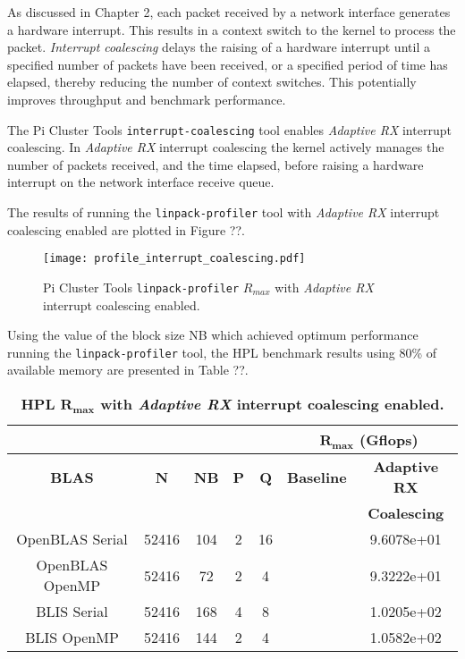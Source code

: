 As discussed in Chapter 2, each packet received by a network interface generates a hardware interrupt. This results in a context switch to the kernel to process the packet. \emph{Interrupt coalescing} delays the raising of a hardware interrupt until a specified number of packets have been received, or a specified period of time has elapsed, thereby reducing the number of context switches. This potentially improves throughput and benchmark performance.

The Pi Cluster Tools \verb|interrupt-coalescing| tool enables \emph{Adaptive RX} interrupt coalescing. In \emph{Adaptive RX} interrupt coalescing the kernel actively manages the number of packets received, and the time elapsed, before raising a hardware interrupt on the network interface receive queue.

The results of running the \verb|linpack-profiler| tool with \emph{Adaptive RX} interrupt coalescing enabled are plotted in Figure ??.

\begin{figure}[h]
	\centering
	\texttt{[image: profile\_interrupt\_coalescing.pdf]}
	\caption{Pi Cluster Tools \texttt{linpack-profiler} $R_{max}$ with \emph{Adaptive RX} interrupt coalescing enabled.}
	\label{fig:subim1}
\end{figure}

Using the value of the block size NB which achieved optimum performance running the \texttt{linpack-profiler} tool, the HPL benchmark results using 80\% of available memory are presented in Table ??. 

\begin{table}[H]
\begin{center}
\begin{tabular}{ |c|c|c|c|c|c|c| } 
\hline
\multicolumn{5}{|c}{} & \multicolumn{2}{|c|}{$\mathbf{R_{max}}$ \textbf{(Gflops)}} \\
\hline
\textbf{BLAS} & \textbf{N} & \textbf{NB} & \textbf{P} & \textbf{Q} & \textbf{Baseline}  & \textbf{Adaptive RX}  \\
              &            &             &            &            &                    & \textbf{Coalescing} \\
\hline
OpenBLAS Serial & 52416 & 104 & 2 & 16 &  & 9.6078e+01 \\
\hline
OpenBLAS OpenMP & 52416 & 72 & 2 & 4 &  & 9.3222e+01 \\
\hline
BLIS Serial     & 52416 & 168 & 4 & 8 &  & 1.0205e+02 \\
\hline
BLIS OpenMP     & 52416 & 144 & 2 & 4 &  & 1.0582e+02 \\
\hline
\end{tabular}
\end{center}
\caption{\label{tab:table-name}\textbf{HPL $\mathbf{R_{max}}$ with \emph{Adaptive RX} interrupt coalescing enabled.}}
\end{table}

